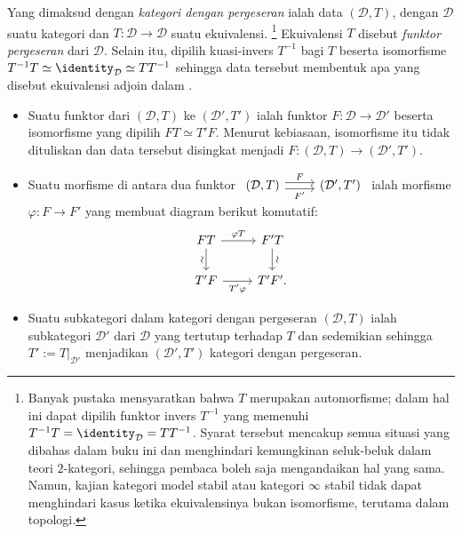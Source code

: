 \begin{definisi}\label{def:category-with-translation}
	Yang dimaksud dengan \emph{kategori dengan pergeseran} ialah data
	$(\mathcal{D},T)$, dengan $\mathcal{D}$ suatu kategori dan
	$T:\mathcal{D}\to\mathcal{D}$ suatu ekuivalensi.%
	\footnote{Banyak pustaka mensyaratkan bahwa $T$ merupakan automorfisme;
	dalam hal ini dapat dipilih funktor invers $T^{-1}$ yang memenuhi
	$T^{-1}T=\identity_{\mathcal D}=TT^{-1}$. Syarat tersebut mencakup semua
	situasi yang dibahas dalam buku ini dan menghindari
	kemungkinan seluk-beluk dalam teori $2$-kategori, sehingga pembaca boleh saja
	mengandaikan hal yang sama. Namun, kajian kategori model stabil atau kategori
	$\infty$ stabil tidak dapat menghindari kasus ketika ekuivalensinya bukan isomorfisme,
	terutama dalam topologi.}
	Ekuivalensi $T$ disebut \emph{funktor pergeseran} dari $\mathcal{D}$.
	Selain itu, dipilih kuasi-invers $T^{-1}$ bagi $T$ beserta isomorfisme
	$T^{-1}T\simeq\identity_{\mathcal D}\simeq TT^{-1}$ sehingga data tersebut
	membentuk apa yang disebut ekuivalensi adjoin dalam
	\cite[Teorema~2.6.12]{Li1}.

	\begin{itemize}
		\item Suatu funktor dari $(\mathcal{D},T)$ ke
		$(\mathcal{D}',T')$ ialah funktor $F:\mathcal{D}\to\mathcal{D}'$
		beserta isomorfisme yang dipilih $FT\simeq T'F$. Menurut kebiasaan,
		isomorfisme itu tidak dituliskan dan data tersebut disingkat menjadi
		$F:(\mathcal{D},T)\to(\mathcal{D}',T')$.
		\item Suatu morfisme di antara dua funktor
		$\begin{tikzcd}
			(\mathcal{D},T) \arrow[r,shift left,"F"]
			\arrow[r,shift right,"{F'}"'] & (\mathcal{D}',T')
		\end{tikzcd}$
		ialah morfisme $\varphi:F\to F'$ yang membuat diagram berikut
		komutatif:
		\[\begin{tikzcd}
			FT \arrow[r,"\varphi T"] \arrow[d,"\sim"' sloped] &
			F'T \arrow[d,"\sim" sloped] \\
			T'F \arrow[r,"{T'\varphi}"'] & T'F'.
		\end{tikzcd}\]
		\item Suatu subkategori dalam kategori dengan pergeseran
		$(\mathcal{D},T)$ ialah subkategori $\mathcal{D}'$ dari $\mathcal{D}$
		yang tertutup terhadap $T$ dan sedemikian sehingga
		$T':=T|_{\mathcal{D}'}$ menjadikan $(\mathcal{D}',T')$ kategori dengan
		pergeseran.
	\end{itemize}


\end{definisi}
